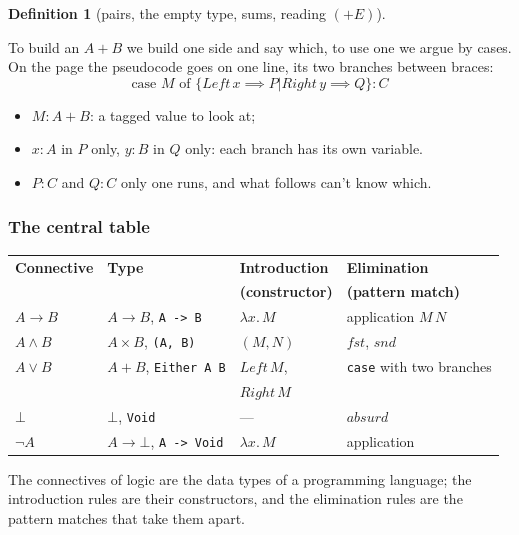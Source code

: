 \documentclass[a4paper, 11pt]{article}
\theoremstyle{definition}
\newtheorem{definition}{Definition}[section]
\begin{document}
\begin{definition}[pairs, the empty type, sums, reading $(+E)$]
    \begin{prooftree}
    \end{prooftree}
    To build an $A + B$ we build one side and say which, to use one we argue by cases. On the page the pseudocode goes
    on one line, its two branches between braces: \[\text{case } M \text{ of } \{\mathit{Left} \, x \implies P | \mathit{Right} \, y 
    \implies Q \} : C\]
    \begin{itemize}
        \item $M: A + B$: a tagged value to look at;
        \item $x: A$ in $P$ only, $y : B$ in $Q$ only: each branch has its own variable.
        \item $P : C$ and $Q: C$ only one runs, and what follows can't know which.
    \end{itemize}
\end{definition}

\subsubsection{The central table}
\begin{center}
    \begin{tabular}{@{} l l l l @{}}
        \toprule
        \textbf{Connective} & \textbf{Type} & \textbf{Introduction} & \textbf{Elimination} \\
                            &               & \textbf{(constructor)} & \textbf{(pattern match)} \\
        \midrule
        $A \to B$  & $A \to B$, \texttt{A -> B}        & $\lambda x.\, M$ & application $M\,N$ \\
        $A \land B$ & $A \times B$, \texttt{(A, B)}    & $(M, N)$         & $\mathit{fst}$, $\mathit{snd}$ \\
        $A \lor B$ & $A + B$, \texttt{Either A B}      & $\mathit{Left}\,M$, & \texttt{case} with two branches \\
                &                                   & $\mathit{Right}\,M$ & \\
        $\bot$     & $\bot$, \texttt{Void}             & ---              & $\mathit{absurd}$ \\
        $\neg A$   & $A \to \bot$, \texttt{A -> Void}  & $\lambda x.\, M$ & application \\
        \bottomrule
    \end{tabular}
\end{center}
The connectives of logic are the data types of a programming language; the introduction rules are their constructors,
and the elimination rules are the pattern matches that take them apart.
\end{document}
